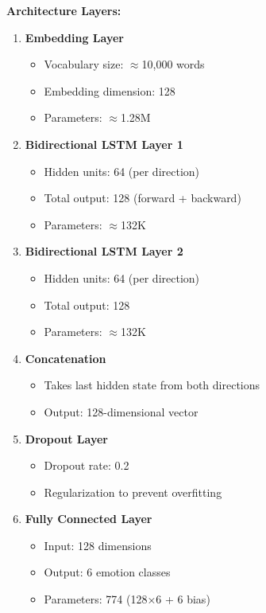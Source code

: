 \documentclass[12pt,a4paper]{article}
\begin{document}
\textbf{Architecture Layers:}
\begin{enumerate}
    \item \textbf{Embedding Layer}
    \begin{itemize}
        \item Vocabulary size: $\approx$10,000 words
        \item Embedding dimension: 128
        \item Parameters: $\approx$1.28M
    \end{itemize}
    
    \item \textbf{Bidirectional LSTM Layer 1}
    \begin{itemize}
        \item Hidden units: 64 (per direction)
        \item Total output: 128 (forward + backward)
        \item Parameters: $\approx$132K
    \end{itemize}
    
    \item \textbf{Bidirectional LSTM Layer 2}
    \begin{itemize}
        \item Hidden units: 64 (per direction)
        \item Total output: 128
        \item Parameters: $\approx$132K
    \end{itemize}
    
    \item \textbf{Concatenation}
    \begin{itemize}
        \item Takes last hidden state from both directions
        \item Output: 128-dimensional vector
    \end{itemize}
    
    \item \textbf{Dropout Layer}
    \begin{itemize}
        \item Dropout rate: 0.2
        \item Regularization to prevent overfitting
    \end{itemize}
    
    \item \textbf{Fully Connected Layer}
    \begin{itemize}
        \item Input: 128 dimensions
        \item Output: 6 emotion classes
        \item Parameters: 774 (128×6 + 6 bias)
    \end{itemize}
\end{enumerate}
\end{document}
